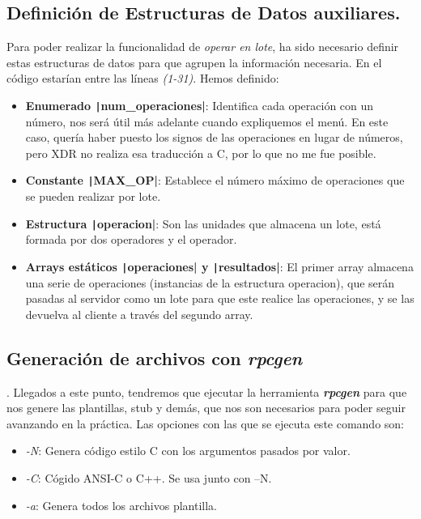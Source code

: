 \documentclass[a4paper,12pt]{article}
\begin{document}
	\subsection{Definición de Estructuras de Datos auxiliares.}
	
		Para poder realizar la funcionalidad de \textit{operar en lote}, ha sido
		necesario definir estas estructuras de datos para que agrupen la información
		necesaria. En el código estarían entre las líneas \textit{(1-31)}. Hemos
		definido:
		
		\begin{itemize}
			\item \textbf{Enumerado \texttt|num_operaciones|}: Identifica cada operación con un número, nos será útil más adelante cuando expliquemos el menú. En este caso, quería haber puesto los signos de las operaciones en lugar de números, pero XDR no realiza esa traducción a C, por  lo que no me fue posible.
			\item \textbf{Constante \texttt|MAX_OP|}: Establece el número máximo de operaciones que se pueden realizar por lote.
			\item  \textbf{Estructura \texttt|operacion|}: Son las unidades que almacena un lote, está formada por dos operadores y el operador.
			\item \textbf{Arrays estáticos \texttt|operaciones| y \texttt|resultados|}: El primer array almacena una serie de operaciones (instancias de la estructura operacion), que serán pasadas al servidor como un lote para que este realice las operaciones, y se las devuelva al cliente a través del segundo array.
		\end{itemize}
		
		\subsection{Generación de archivos con \textit{rpcgen}}.
		Llegados a este punto, tendremos que ejecutar la herramienta \textit{\textbf{rpcgen}} para que nos genere las plantillas, stub y demás, que nos son necesarios para poder seguir avanzando en la práctica. Las opciones con las que se ejecuta este comando son:
		
		\begin{itemize}
			\item \textit{-N}: Genera código estilo C con los argumentos pasados por valor.
			\item \textit{-C}: Cógido ANSI-C o C++. Se usa junto con –N.
			\item \textit{-a}: Genera todos los archivos plantilla.
		\end{itemize}
		
\end{document}
